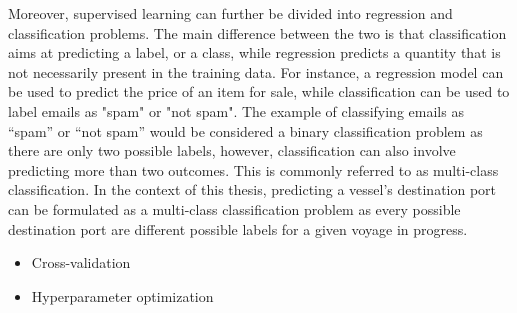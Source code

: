 Moreover, supervised learning can further be divided into regression and classification problems. The main difference between the two is that classification aims at predicting a label, or a class, while regression predicts a quantity that is not necessarily present in the training data. For instance, a regression model can be used to predict the price of an item for sale, while classification can be used to label emails as "spam" or "not spam". The example of classifying emails as ``spam'' or ``not spam'' would be considered a binary classification problem as there are only two possible labels, however, classification can also involve predicting more than two outcomes. This is commonly referred to as multi-class classification. In the context of this thesis, predicting a vessel's destination port can be formulated as a multi-class classification problem as every possible destination port are different possible labels for a given voyage in progress.


\begin{itemize}
    \item Cross-validation
    \item Hyperparameter optimization
\end{itemize}
